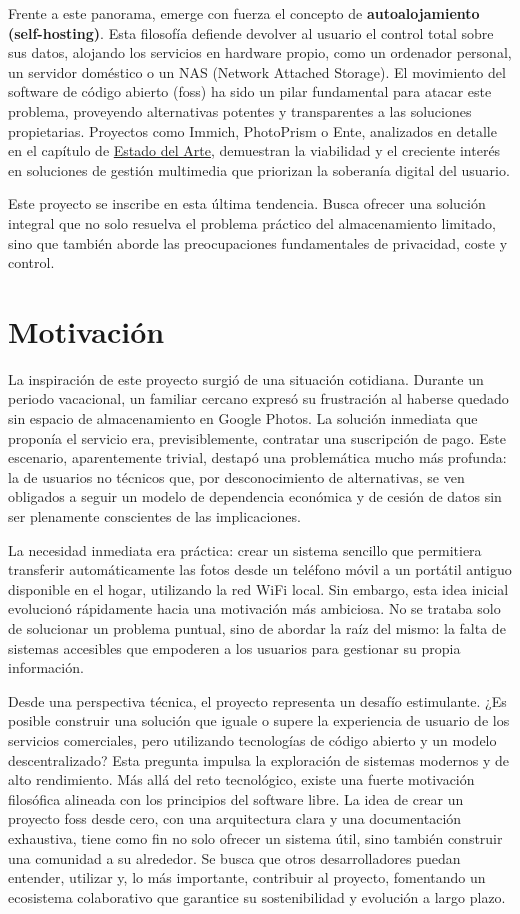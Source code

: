 Frente a este panorama, emerge con fuerza el concepto de \textbf{autoalojamiento (self-hosting)}. Esta filosofía defiende devolver al usuario el control total sobre sus datos, alojando los servicios en hardware propio, como un ordenador personal, un servidor doméstico o un NAS (Network Attached Storage). El movimiento del software de código abierto (\acrshort{foss}) ha sido un pilar fundamental para atacar este problema, proveyendo alternativas potentes y transparentes a las soluciones propietarias. Proyectos como Immich, PhotoPrism o Ente, analizados en detalle en el capítulo de \hyperref[sec:estado_del_arte]{Estado del Arte}, demuestran la viabilidad y el creciente interés en soluciones de gestión multimedia que priorizan la soberanía digital del usuario.

Este proyecto se inscribe en esta última tendencia. Busca ofrecer una solución integral que no solo resuelva el problema práctico del almacenamiento limitado, sino que también aborde las preocupaciones fundamentales de privacidad, coste y control.
\section{Motivación}

La inspiración de este proyecto surgió de una situación cotidiana. Durante un periodo vacacional, un familiar cercano expresó su frustración al haberse quedado sin espacio de almacenamiento en Google Photos. La solución inmediata que proponía el servicio era, previsiblemente, contratar una suscripción de pago. Este escenario, aparentemente trivial, destapó una problemática mucho más profunda: la de usuarios no técnicos que, por desconocimiento de alternativas, se ven obligados a seguir un modelo de dependencia económica y de cesión de datos sin ser plenamente conscientes de las implicaciones.

La necesidad inmediata era práctica: crear un sistema sencillo que permitiera transferir automáticamente las fotos desde un teléfono móvil a un portátil antiguo disponible en el hogar, utilizando la red WiFi local. Sin embargo, esta idea inicial evolucionó rápidamente hacia una motivación más ambiciosa. No se trataba solo de solucionar un problema puntual, sino de abordar la raíz del mismo: la falta de sistemas accesibles que empoderen a los usuarios para gestionar su propia información.

Desde una perspectiva técnica, el proyecto representa un desafío estimulante. ¿Es posible construir una solución que iguale o supere la experiencia de usuario de los servicios comerciales, pero utilizando tecnologías de código abierto y un modelo descentralizado? Esta pregunta impulsa la exploración de sistemas modernos y de alto rendimiento.
Más allá del reto tecnológico, existe una fuerte motivación filosófica alineada con los principios del software libre. La idea de crear un proyecto \acrshort{foss} desde cero, con una arquitectura clara y una documentación exhaustiva, tiene como fin no solo ofrecer un sistema útil, sino también construir una comunidad a su alrededor. Se busca que otros desarrolladores puedan entender, utilizar y, lo más importante, contribuir al proyecto, fomentando un ecosistema colaborativo que garantice su sostenibilidad y evolución a largo plazo.

